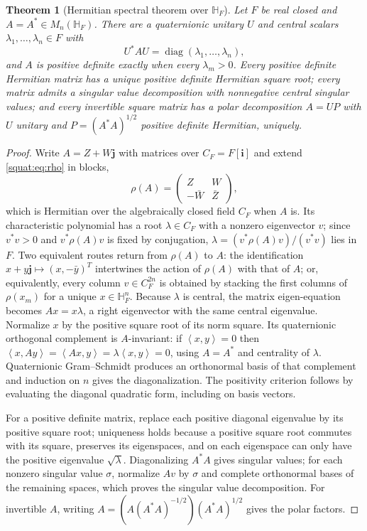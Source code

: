 \documentclass[11pt,letterpaper]{article}
\numberwithin{equation}{section}
\newtheorem{theorem}{Theorem}[section]
\theoremstyle{definition}
\theoremstyle{remark}
\newcommand{\HF}{\mathbb H_F}
\newcommand{\ii}{\mathbf i}
\newcommand{\jj}{\mathbf j}
\newcommand{\diag}{\operatorname{diag}}
\newcommand{\angles}[1]{\left\langle#1\right\rangle}
\begin{document}
\begin{theorem}[Hermitian spectral theorem over $\HF$]\label{squat:thm:spectral}
Let $F$ be real closed and $A=A^*\in M_n(\HF)$. There are a quaternionic unitary $U$ and
central scalars $\lambda_1,\ldots,\lambda_n\in F$ with
\[
 U^*AU=\diag(\lambda_1,\ldots,\lambda_n),
\]
and $A$ is positive definite exactly when every $\lambda_m>0$. Every positive definite
Hermitian matrix has a unique positive definite Hermitian square root; every matrix admits
a singular value decomposition with nonnegative central singular values; and every
invertible square matrix has a polar decomposition $A=UP$ with $U$ unitary and
$P=(A^*A)^{1/2}$ positive definite Hermitian, uniquely.
\end{theorem}
\begin{proof}
Write $A=Z+W\jj$ with matrices over $C_F=F[\ii]$ and extend \cref{squat:eq:rho} in blocks,
\[
 \rho(A)=\begin{pmatrix}Z&W\\-\bar W&\bar Z\end{pmatrix},
\]
which is Hermitian over the algebraically closed field $C_F$ when $A$ is. Its
characteristic polynomial has a root $\lambda\in C_F$ with a nonzero eigenvector $v$; since
$v^*v>0$ and $v^*\rho(A)v$ is fixed by conjugation, $\lambda=(v^*\rho(A)v)/(v^*v)$ lies in
$F$. Two equivalent routes return from $\rho(A)$ to $A$: the identification
$x+y\jj\mapsto(x,-\bar y)^T$ intertwines the action of $\rho(A)$ with that of $A$; or,
equivalently, every column $v\in C_F^{2n}$ is obtained by stacking the first columns of
$\rho(x_m)$ for a unique $x\in\HF^n$. Because $\lambda$ is central, the matrix
eigen-equation becomes $Ax=x\lambda$, a right eigenvector with the same central
eigenvalue. Normalize $x$ by the positive square root of its norm square. Its quaternionic
orthogonal complement is $A$-invariant: if $\angles{x,y}=0$ then
$\angles{x,Ay}=\angles{Ax,y}=\lambda\angles{x,y}=0$, using $A=A^*$ and centrality of
$\lambda$. Quaternionic Gram--Schmidt produces an orthonormal basis of that complement and
induction on $n$ gives the diagonalization. The positivity criterion follows by evaluating
the diagonal quadratic form, including on basis vectors.

For a positive definite matrix, replace each positive diagonal eigenvalue by its positive
square root; uniqueness holds because a positive square root commutes with its square,
preserves its eigenspaces, and on each eigenspace can only have the positive eigenvalue
$\sqrt\lambda$. Diagonalizing $A^*A$ gives singular values; for each nonzero singular
value $\sigma$, normalize $Av$ by $\sigma$ and complete orthonormal bases of the remaining
spaces, which proves the singular value decomposition. For invertible $A$, writing
$A=(A(A^*A)^{-1/2})(A^*A)^{1/2}$ gives the polar factors.
\end{proof}
\end{document}
